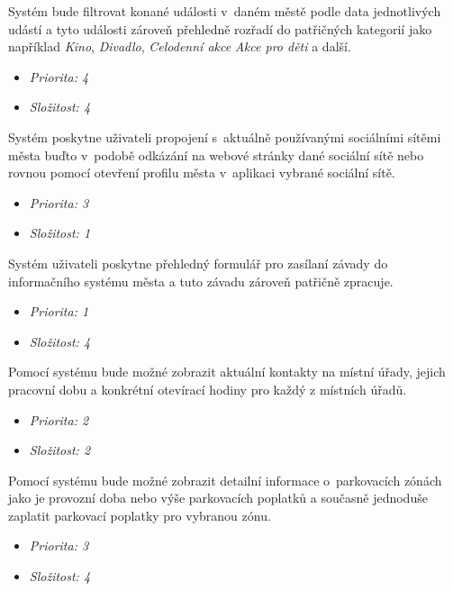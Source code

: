 
Systém bude filtrovat konané události v~daném městě podle data jednotlivých udástí a tyto události zároveň přehledně rozřadí do patřičných
kategorií jako například \textit{Kino}, \textit{Divadlo}, \textit{Celodenní akce} \textit{Akce pro děti} a další.

\begin{itemize}
  \item \textit{Priorita: 4}
  \item \textit{Složitost: 4}
\end{itemize}

Systém poskytne uživateli propojení s~aktuálně používanými sociálními sítěmi města buďto v~podobě odkázání na webové stránky 
dané sociální sítě nebo rovnou pomocí otevření profilu města v~aplikaci vybrané sociální sítě.  

\begin{itemize}
  \item \textit{Priorita: 3}
  \item \textit{Složitost: 1}
\end{itemize}

Systém uživateli poskytne přehledný formulář pro zasílaní závady do informačního systému města a tuto závadu zároveň patřičně zpracuje.

\begin{itemize}
  \item \textit{Priorita: 1}
  \item \textit{Složitost: 4}
\end{itemize}

Pomocí systému bude možné zobrazit aktuální kontakty na místní úřady, jejich pracovní dobu a konkrétní otevírací hodiny pro každý z místních úřadů.

\begin{itemize}
  \item \textit{Priorita: 2}
  \item \textit{Složitost: 2}
\end{itemize}

Pomocí systému bude možné zobrazit detailní informace o~parkovacích zónách jako je provozní doba nebo výše parkovacích poplatků a současně jednoduše zaplatit parkovací poplatky pro vybranou zónu.
\begin{itemize}
  \item \textit{Priorita: 3}
  \item \textit{Složitost: 4}
\end{itemize}

